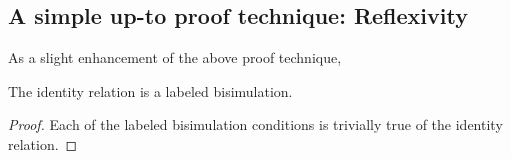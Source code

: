 

\subsection{A simple up-to proof technique: Reflexivity}

As a slight enhancement of the above proof technique, 

\begin{lemma}\label{lem:identity-labeled-bisim}
  The identity relation is a labeled bisimulation.
\end{lemma}
\begin{proof}
  Each of the labeled bisimulation conditions is trivially true of the identity relation.
\end{proof}

